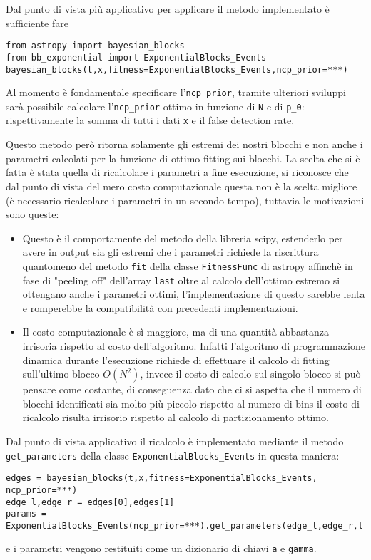 \documentclass[10pt,a4paper]{report}
\begin{document}
Dal punto di vista più applicativo per applicare il metodo implementato è sufficiente fare
\begin{verbatim}
from astropy import bayesian_blocks
from bb_exponential import ExponentialBlocks_Events
bayesian_blocks(t,x,fitness=ExponentialBlocks_Events,ncp_prior=***)
\end{verbatim}
Al momento è fondamentale specificare l'\texttt{ncp\_prior}, tramite ulteriori sviluppi sarà possibile calcolare l'\texttt{ncp\_prior} ottimo in funzione di \texttt{N} e di \texttt{p\_0}: rispettivamente la somma di tutti i dati \texttt{x} e il false detection rate.

Questo metodo però ritorna solamente gli estremi dei nostri blocchi e non anche i parametri calcolati per la funzione di ottimo fitting sui blocchi.
La scelta che si è fatta è stata quella di ricalcolare i parametri a fine esecuzione, si riconosce che dal punto di vista del mero costo computazionale questa non è la scelta migliore (è necessario ricalcolare i parametri in un secondo tempo), tuttavia le motivazioni sono queste:
\begin{itemize}
\item Questo è il comportamente del metodo della libreria scipy, estenderlo per avere in output sia gli estremi che i parametri richiede la riscrittura quantomeno del metodo \texttt{fit} della classe \texttt{FitnessFunc} di astropy affinchè in fase di "peeling off" dell'array \texttt{last} oltre al calcolo dell'ottimo estremo si ottengano anche i parametri ottimi, l'implementazione di questo sarebbe lenta e romperebbe la compatibilità con precedenti implementazioni.
\item Il costo computazionale è sì maggiore, ma di una quantità abbastanza irrisoria rispetto al costo dell'algoritmo. Infatti l'algoritmo di programmazione dinamica durante l'esecuzione richiede di effettuare il calcolo di fitting sull'ultimo blocco $O(N^2)$, invece il costo di calcolo sul singolo blocco si può pensare come costante, di conseguenza dato che ci si aspetta che il numero di blocchi identificati sia molto più piccolo rispetto al numero di bins il costo di ricalcolo risulta irrisorio rispetto al calcolo di partizionamento ottimo.
\end{itemize}
Dal punto di vista applicativo il ricalcolo è implementato mediante il metodo \texttt{get\_parameters} della classe \texttt{ExponentialBlocks\_Events} in questa maniera:
\begin{verbatim}
edges = bayesian_blocks(t,x,fitness=ExponentialBlocks_Events, ncp_prior=***)
edge_l,edge_r = edges[0],edges[1]
params = ExponentialBlocks_Events(ncp_prior=***).get_parameters(edge_l,edge_r,t,x)
\end{verbatim}
e i parametri vengono restituiti come un dizionario di chiavi \texttt{a} e \texttt{gamma}.
\end{document}
